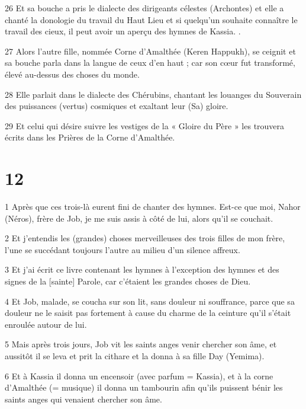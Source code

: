 \par 26 Et sa bouche a pris le dialecte des dirigeants célestes (Archontes) et elle a chanté la donologie du travail du Haut Lieu et si quelqu'un souhaite connaître le travail des cieux, il peut avoir un aperçu des hymnes de Kassia. .

\par 27 Alors l'autre fille, nommée Corne d'Amalthée (Keren Happukh), se ceignit et sa bouche parla dans la langue de ceux d'en haut ; car son cœur fut transformé, élevé au-dessus des choses du monde.

\par 28 Elle parlait dans le dialecte des Chérubins, chantant les louanges du Souverain des puissances (vertus) cosmiques et exaltant leur (Sa) gloire.

\par 29 Et celui qui désire suivre les vestiges de la « Gloire du Père » les trouvera écrits dans les Prières de la Corne d'Amalthée.

\chapter{12}

\par 1 Après que ces trois-là eurent fini de chanter des hymnes. Est-ce que moi, Nahor (Néros), frère de Job, je me suis assis à côté de lui, alors qu'il se couchait.

\par 2 Et j'entendis les (grandes) choses merveilleuses des trois filles de mon frère, l'une se succédant toujours l'autre au milieu d'un silence affreux.

\par 3 Et j'ai écrit ce livre contenant les hymnes à l'exception des hymnes et des signes de la [sainte] Parole, car c'étaient les grandes choses de Dieu.

\par 4 Et Job, malade, se coucha sur son lit, sans douleur ni souffrance, parce que sa douleur ne le saisit pas fortement à cause du charme de la ceinture qu'il s'était enroulée autour de lui.

\par 5 Mais après trois jours, Job vit les saints anges venir chercher son âme, et aussitôt il se leva et prit la cithare et la donna à sa fille Day (Yemima).

\par 6 Et à Kassia il donna un encensoir (avec parfum = Kassia), et à la corne d'Amalthée (= musique) il donna un tambourin afin qu'ils puissent bénir les saints anges qui venaient chercher son âme.

